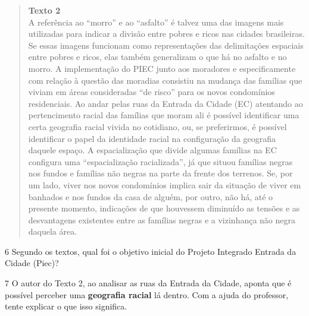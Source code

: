 \begin{quote}
\textbf{Texto 2}\\
A referência ao “morro” e ao “asfalto” é talvez uma das imagens mais
utilizadas para indicar a divisão entre pobres e ricos nas cidades
brasileiras. Se essas imagens funcionam como representações das
delimitações espaciais entre pobres e ricos, elas também generalizam o
que há no asfalto e no morro. A implementação do PIEC junto aos
moradores e especificamente com relação à questão das moradias consistiu
na mudança das famílias que viviam em áreas consideradas “de risco”
para os novos condomínios residenciais. Ao andar pelas ruas da Entrada
da Cidade (EC) atentando ao pertencimento racial das famílias que moram
ali é possível identificar uma certa geografia racial vivida no
cotidiano, ou, se preferirmos, é possível identificar o papel da
identidade racial na configuração da geografia daquele espaço. A
espacialização que divide algumas famílias na EC configura uma
“espacialização racializada”, já que situou famílias negras nos fundos
e famílias não negras na parte da frente dos terrenos. Se, por um lado,
viver nos novos condomínios implica sair da situação de viver em
banhados e nos fundos da casa de alguém, por outro, não há, até o
presente momento, indicações de que houvessem diminuído as tensões e as
desvantagens existentes entre as famílias negras e a vizinhança
não negra daquela área.

\end{quote}

\num{6} Segundo os textos, qual foi o objetivo inicial do Projeto Integrado
Entrada da Cidade (Piec)?


\num{7} O autor do Texto 2, ao analisar as ruas da Entrada da Cidade, aponta que
é possível perceber uma \textbf{geografia racial} lá dentro. Com a ajuda
do professor, tente explicar o que isso significa.


